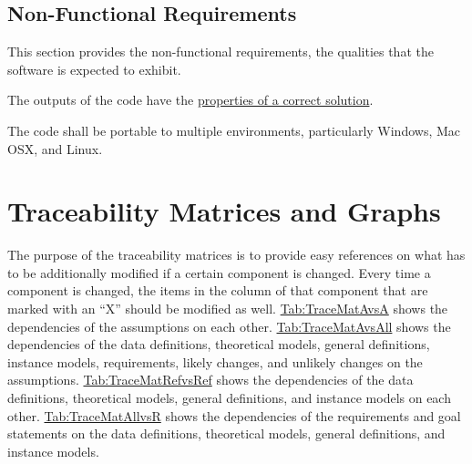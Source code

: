 \documentclass[12pt]{article}
\begin{document}
\subsection{Non-Functional Requirements}
\label{Sec:NFRs}
This section provides the non-functional requirements, the qualities that the software is expected to exhibit.

\begin{description}[font=\normalfont]
\item[Correctness:\phantomsection\label{correct}]{The outputs of the code have the \hyperref[Sec:CorSolProps]{properties of a correct solution}.}
\item[Portability:\phantomsection\label{portable}]{The code shall be portable to multiple environments, particularly Windows, Mac OSX, and Linux.}
\end{description}
\section{Traceability Matrices and Graphs}
\label{Sec:TraceMatrices}
The purpose of the traceability matrices is to provide easy references on what has to be additionally modified if a certain component is changed. Every time a component is changed, the items in the column of that component that are marked with an ``X'' should be modified as well. \hyperref[Table:TraceMatAvsA]{Tab:TraceMatAvsA} shows the dependencies of the assumptions on each other. \hyperref[Table:TraceMatAvsAll]{Tab:TraceMatAvsAll} shows the dependencies of the data definitions, theoretical models, general definitions, instance models, requirements, likely changes, and unlikely changes on the assumptions. \hyperref[Table:TraceMatRefvsRef]{Tab:TraceMatRefvsRef} shows the dependencies of the data definitions, theoretical models, general definitions, and instance models on each other. \hyperref[Table:TraceMatAllvsR]{Tab:TraceMatAllvsR} shows the dependencies of the requirements and goal statements on the data definitions, theoretical models, general definitions, and instance models.
\end{document}
